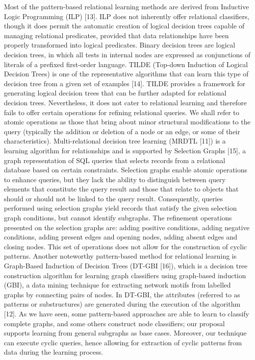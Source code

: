 \documentclass{article}%
\begin{document}
\newline%
Most of the pattern{-}based relational learning methods are derived from Inductive Logic Programming (ILP) {[}13{]}. ILP does not inherently offer relational classifiers, though it does permit the automatic creation of logical decision trees capable of managing relational predicates, provided that data relationships have been properly transformed into logical predicates. Binary decision trees are logical decision trees, in which all tests in internal nodes are expressed as conjunctions of literals of a prefixed first{-}order language. TILDE (Top{-}down Induction of Logical Decision Trees) is one of the representative algorithms that can learn this type of decision tree from a given set of examples {[}14{]}. TILDE provides a framework for generating logical decision trees that can be further adapted for relational decision trees. Nevertheless, it does not cater to relational learning and therefore fails to offer certain operations for refining relational queries. We shall refer to atomic operations as those that bring about minor structural modifications to the query (typically the addition or deletion of a node or an edge, or some of their characteristics).\newline%
\newline%
Multi{-}relational decision tree learning (MRDTL {[}11{]}) is a learning algorithm for relationships and is supported by Selection Graphs {[}15{]}, a graph representation of SQL queries that selects records from a relational database based on certain constraints. Selection graphs enable atomic operations to enhance queries, but they lack the ability to distinguish between query elements that constitute the query result and those that relate to objects that should or should not be linked to the query result. Consequently, queries performed using selection graphs yield records that satisfy the given selection graph conditions, but cannot identify subgraphs. The refinement operations presented on the selection graphs are: adding positive conditions, adding negative conditions, adding present edges and opening nodes, adding absent edges and closing nodes. This set of operations does not allow for the construction of cyclic patterns.\newline%
\newline%
Another noteworthy pattern{-}based method for relational learning is Graph{-}Based Induction of Decision Trees (DT{-}GBI {[}16{]}), which is a decision tree construction algorithm for learning graph classifiers using graph{-}based induction (GBI), a data mining technique for extracting network motifs from labelled graphs by connecting pairs of nodes. In DT{-}GBI, the attributes (referred to as patterns or substructures) are generated during the execution of the algorithm {[}12{]}.\newline%
\newline%
As we have seen, some pattern{-}based approaches are able to learn to classify complete graphs, and some others construct node classifiers; our proposal supports learning from general subgraphs as base cases. Moreover, our technique can execute cyclic queries, hence allowing for extraction of cyclic patterns from data during the learning process.
\end{document}
